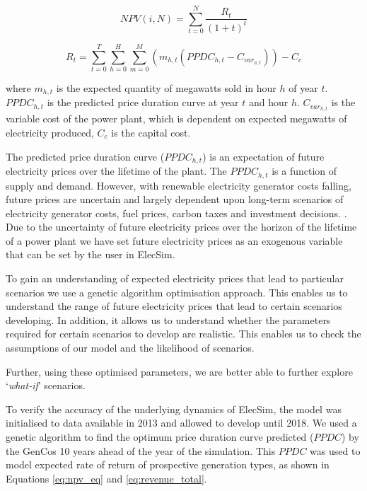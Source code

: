 \begin{equation} \label{eq:npv_eq}
NPV(i, N) = \sum_{t=0}^{N}\frac{R_t}{(1+t)^t}
\end{equation}




\begin{equation}
\label{eq:revenue_total}
R_t = 
\sum\limits_{t=0}^T 
\sum\limits_{h=0}^H
\sum\limits_{m=0}^M \left(
m_{h,t}(PPDC_{h,t}
-
C_{var_{h,t}})\right)
- C_c
\end{equation}

\noindent where $m_{h,t}$ is the expected quantity of megawatts sold in hour $h$ of year $t$. $PPDC_{h,t}$ is the predicted price duration curve at year $t$ and hour $h$. $C_{var_{h,t}}$ is the variable cost of the power plant, which is dependent on expected megawatts of electricity produced, $C_c$ is the capital cost.

The predicted price duration curve ($PPDC_{h,t}$) is an expectation of future electricity prices over the lifetime of the plant. The $PPDC_{h,t}$ is a function of supply and demand. However, with renewable electricity generator costs falling, future prices are uncertain and largely dependent upon long-term scenarios of electricity generator costs, fuel prices, carbon taxes and investment decisions. \cite{IRENA2014}. Due to the uncertainty of future electricity prices over the horizon of the lifetime of a power plant we have set future electricity prices as an exogenous variable that can be set by the user in ElecSim. 


To gain an understanding of expected electricity prices that lead to particular scenarios we use a genetic algorithm optimisation approach. This enables us to understand the range of future electricity prices that lead to certain scenarios developing. In addition, it allows us to understand whether the parameters required for certain scenarios to develop are realistic. This enables us to check the assumptions of our model and the likelihood of scenarios.

Further, using these optimised parameters, we are better able to further explore `\textit{what-if}' scenarios.















To verify the accuracy of the underlying dynamics of ElecSim, the model was initialised to data available in 2013 and allowed to develop until 2018. We used a genetic algorithm to find the optimum price duration curve predicted ($PPDC$) by the GenCos 10 years ahead of the year of the simulation. This $PPDC$ was used to model expected rate of return of prospective generation types, as shown in Equations \ref{eq:npv_eq} and \ref{eq:revenue_total}. 


